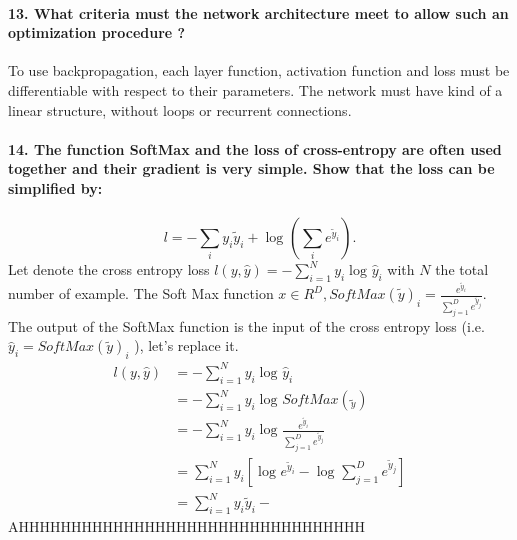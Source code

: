 \documentclass{article}
\theoremstyle{plain}%
\theoremstyle{definition}
\theoremstyle{remark}
\begin{document}
\paragraph{13. What criteria must the network architecture meet to allow such an optimization procedure ?}
To use backpropagation, each layer function, activation function and loss must be differentiable with respect to their parameters. The network must have kind of a linear structure, without loops or recurrent connections. 

\paragraph{14. The function SoftMax and the loss of cross-entropy are often used together and their gradient is very simple. Show that the loss can be simpliﬁed by:}
\[
    l = - \sum_{i}^{} y_i \tilde{y}_i + \log_{} (\sum_{i}^{} e^{\tilde{y}_i}) 
.\]
Let denote the cross entropy loss $ l(y, \hat{y}) = - \sum_{i=1}^{N} y_i \log_{} \hat{y}_i $ with $ N $ the total number of example. The Soft Max function $x \in R^D, SoftMax(\tilde{y})_i = \frac{e^{\tilde{y}_i}}{\sum_{j=1}^{D} e^{\tilde{y}_j} } $. The output of the SoftMax function is the input of the cross entropy loss (i.e. $ \hat{y}_i = SoftMax(\tilde{y})_i $ ), let's replace it. 
\begin{align*}
    l(y, \hat{y}) &= - \sum_{i=1}^{N} y_i \log_{} \hat{y}_i \\
        &= - \sum_{i=1}^{N} y_i \log_{} SoftMax(\tilde{_y}) \\
        &= - \sum_{i=1}^{N} y_i \log_{} \frac{e^{\tilde{y}_i}}{\sum_{j=1}^{D} e^{\tilde{y}_j} } \\
        &= \sum_{i=1}^{N} y_i [ \log_{} e^{\tilde{y}_i} - \log_{} \sum_{j=1}^{D} e^{\tilde{y}_j}  ] \\
        &= \sum_{i=1}^{N} y_i \tilde{y}_i - 
\end{align*}
AHHHHHHHHHHHHHHHHHHHHHHHHHHHHHHHHH
\end{document}
